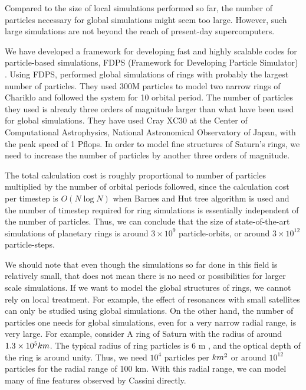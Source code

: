 \documentclass[]{pasj01}
\begin{document}
Compared to the size of local simulations performed so far, the number
of particles necessary for global simulations might seem too
large. However, such large simulations are not beyond the reach of
present-day supercomputers.

We have developed a framework for developing fast and highly scalable
codes for particle-based simulations, FDPS (Framework for Developing
Particle Simulator) \citep{Iwasawaetal2016}. Using FDPS,
\citet{MichikoshiKokubo2017} performed global simulations of rings
with probably the largest number of particles. They used 300M
particles to model two narrow rings of Chariklo and followed the
system for 10 orbital period. The number of particles they used is
already three orders of magnitude larger than what have been used for
global simulations. They have used Cray XC30 at the Center of
Computational Astrophysics, National Astronomical Observatory of
Japan, with the peak speed of 1 Pflops. In order to model fine
structures of Saturn's rings, we need to increase the number of
particles by another three orders of magnitude.

The total calculation cost is roughly proportional to number of
particles multiplied by the number of orbital periods followed, since
the calculation cost per timestep is $O(N \log N)$ when Barnes and Hut
tree algorithm \citep{BarnesHut1986} is used and the number of
timestep required for ring simulations is essentially independent of
the number of particles. Thus, we can conclude that the size of
state-of-the-art simulations of planetary rings is around $3 \times
10^9$ particle-orbits, or around $3 \times 10^{12}$ particle-steps.

We should note that even though the simulations so far done in this
field is relatively small, that does not mean there is no need or
possibilities for larger scale simulations. If we want to model the
global structures of rings, we cannot rely on local treatment. For
example, the effect of resonances with small satellites can only be
studied using global simulations. On the other hand, the number of
particles one needs for global simulations, even for a very narrow
radial range, is very large. For example, consider A ring of Saturn
with the radius of around $1.3\times 10^5\rm km$. The typical radius
of ring particles is 6 m \citep{ZEBKER1985531}, and the optical depth
of the ring is around unity. Thus, we need $10^4$ particles per $\rm
km^2$ or around $10^{12}$ particles for the radial range of 100
km. With this radial range, we can model many of fine features
observed by Cassini directly.
\end{document}

